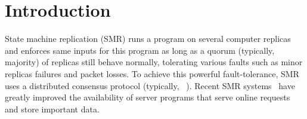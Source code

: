\section{Introduction} \label{sec:intro}


State machine replication (SMR) runs a program on several computer 
replicas and enforces same inputs for this program as long as a quorum 
(typically, majority) of replicas still behave normally, tolerating various 
faults such as minor replicas failures and packet losses. To achieve 
this powerful 
fault-tolerance, SMR uses 
a distributed consensus protocol (typically, 
\paxos~\cite{paxos:practical,paxos,paxos:simple,paxos:complex}). Recent SMR 
systems~\cite{eve:osdi12,rex:eurosys14,crane:sosp15} have greatly 
improved the availability of server programs that serve online requests and 
store important data.










